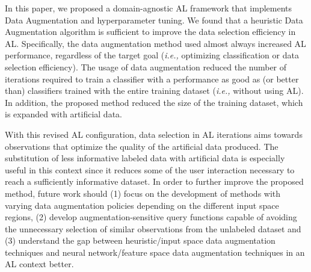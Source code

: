 In this paper, we proposed a domain-agnostic AL framework that implements Data
Augmentation and hyperparameter tuning. We found that a heuristic Data
Augmentation algorithm is sufficient to improve the data selection efficiency
in AL\@. Specifically, the data augmentation method used almost always
increased AL performance, regardless of the target goal (\textit{i.e.,}
optimizing classification or data selection efficiency). The usage of data
augmentation reduced the number of iterations required to train a
classifier with a performance as good as (or better than) classifiers trained
with the entire training dataset (\textit{i.e.,} without using AL). In
addition, the proposed method reduced the size of the training dataset,
which is expanded with artificial data. 

With this revised AL configuration, data selection in AL iterations aims towards
observations that optimize the quality of the artificial data produced. The
substitution of less informative labeled data with artificial data is
especially useful in this context since it reduces some of
the user interaction necessary to reach a sufficiently informative dataset.
In order to further improve the proposed method, future work should
(1) focus on the development of methods with varying data augmentation
policies depending on the different input space regions, (2) develop
augmentation-sensitive query functions capable of avoiding the unnecessary
selection of similar observations from the unlabeled dataset and (3)
understand the gap between heuristic/input space data augmentation techniques
and neural network/feature space data augmentation techniques in an AL
context better.
